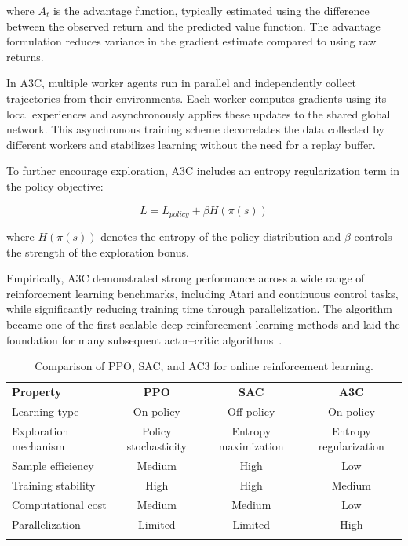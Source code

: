 where $A_t$ is the advantage function, typically estimated using the difference between the observed return and the predicted value function.
The advantage formulation reduces variance in the gradient estimate compared to using raw returns.

In A3C, multiple worker agents run in parallel and independently collect trajectories from their environments.
Each worker computes gradients using its local experiences and asynchronously applies these updates to the shared global network.
This asynchronous training scheme decorrelates the data collected by different workers and stabilizes learning without the need for a replay buffer.

To further encourage exploration, A3C includes an entropy regularization term in the policy objective:

\begin{equation} \label{eq:ac32}
L = L_{policy} + \beta H(\pi(s))
\end{equation}

where $H(\pi(s))$ denotes the entropy of the policy distribution and $\beta$ controls the strength of the exploration bonus.

Empirically, A3C demonstrated strong performance across a wide range of reinforcement learning benchmarks, including Atari and continuous control tasks, while significantly reducing training time through parallelization.
The algorithm became one of the first scalable deep reinforcement learning methods and laid the foundation for many subsequent actor–critic algorithms~\cite{mnih2016}.

\begin{table}[h]
\centering
\caption{Comparison of PPO, SAC, and AC3 for online reinforcement learning.}
\label{tab:online_rl_algorithms}
\begin{tabular}{lccc}
\bluetoprule
\textbf{Property} & \textbf{PPO} & \textbf{SAC} & \textbf{A3C} \\
\blueheadrule
Learning type & On-policy & Off-policy & On-policy \\
Exploration mechanism & Policy stochasticity & Entropy maximization & Entropy regularization \\
Sample efficiency & Medium & High & Low \\
Training stability & High & High & Medium \\
Computational cost & Medium & Medium & Low \\
Parallelization & Limited & Limited & High \\
\bluebottomrule
\end{tabular}
\end{table}

